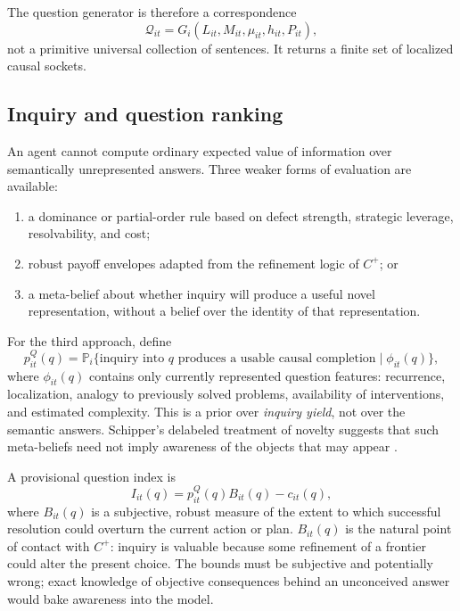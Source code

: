 \documentclass[11pt]{article}
\newcommand{\cplus}{C^{+}}
\newcommand{\Q}{\mathcal{Q}}
\newcommand{\Prb}{\mathbb{P}}
\begin{document}
	The question generator is therefore a correspondence
	\begin{equation}
		\Q_{it}=G_i(L_{it},M_{it},\mu_{it},h_{it},P_{it}),
	\end{equation}
	not a primitive universal collection of sentences.  It returns a finite set of localized causal sockets.
	
	\subsection{Inquiry and question ranking}
	
	An agent cannot compute ordinary expected value of information over semantically unrepresented answers.  Three weaker forms of evaluation are available:
	\begin{enumerate}
		\item a dominance or partial-order rule based on defect strength, strategic leverage, resolvability, and cost;
		\item robust payoff envelopes adapted from the refinement logic of $\cplus$; or
		\item a meta-belief about whether inquiry will produce a useful novel representation, without a belief over the identity of that representation.
	\end{enumerate}
	
	For the third approach, define
	\begin{equation}
		p_{it}^Q(q)=
		\Prb_i\{\text{inquiry into }q\text{ produces a usable causal completion}\mid\phi_{it}(q)\},
	\end{equation}
	where $\phi_{it}(q)$ contains only currently represented question features: recurrence, localization, analogy to previously solved problems, availability of interventions, and estimated complexity.  This is a prior over \emph{inquiry yield}, not over the semantic answers.  Schipper's delabeled treatment of novelty suggests that such meta-beliefs need not imply awareness of the objects that may appear \citep{Schipper2025}.
	
	A provisional question index is
	\begin{equation}
		I_{it}(q)=p_{it}^{Q}(q)B_{it}(q)-c_{it}(q),
	\end{equation}
	where $B_{it}(q)$ is a subjective, robust measure of the extent to which successful resolution could overturn the current action or plan.  $B_{it}(q)$ is the natural point of contact with $\cplus$: inquiry is valuable because some refinement of a frontier could alter the present choice.  The bounds must be subjective and potentially wrong; exact knowledge of objective consequences behind an unconceived answer would bake awareness into the model.
	
\end{document}
